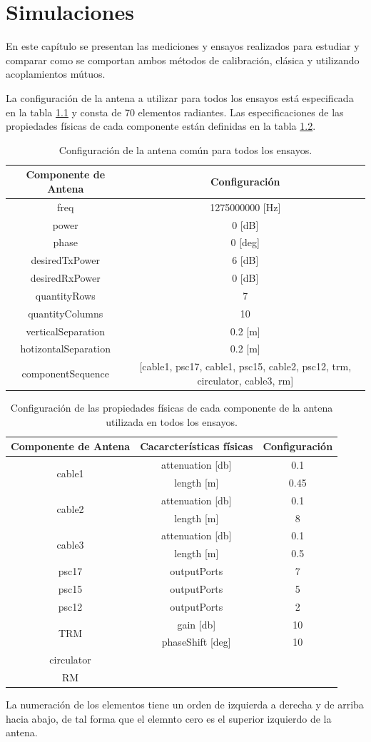 \chapter{Simulaciones}

En este capítulo se presentan las mediciones y ensayos realizados para estudiar y comparar como se comportan ambos métodos de
calibración, clásica y utilizando acoplamientos mútuos.

La configuración de la antena a utilizar para todos los ensayos está especificada en la tabla \ref{tab:configurationUsed} y 
consta de 70 elementos radiantes. Las especificaciones de las propiedades físicas de cada componente están definidas en la 
tabla \ref{tab:configurationOfComponents}.
\begin{table}[H]
  \footnotesize
  \centering
  \begin{tabular}{|c|c|}
	\hline
	\textbf{Componente de Antena} & \textbf{Configuración} \tabularnewline \hline 
	freq &  1275000000 [Hz] \tabularnewline\hline 
	power & 0 [dB] \tabularnewline \hline 
	phase & 0 [deg] \tabularnewline \hline 
	desiredTxPower & 6 [dB] \tabularnewline \hline 
	desiredRxPower & 0 [dB] \tabularnewline \hline 
	quantityRows & 7 \tabularnewline \hline 
	quantityColumns & 10 \tabularnewline \hline 
	verticalSeparation & 0.2 [m] \tabularnewline \hline 
	hotizontalSeparation & 0.2 [m] \tabularnewline \hline 
	componentSequence & [cable1, psc17, cable1, psc15, cable2, psc12, trm, circulator, cable3, rm] \tabularnewline \hline 
  \end{tabular}
  \caption{Configuración de la antena común para todos los ensayos.}
  \label{tab:configurationUsed}
\end{table}
\begin{table}[H]
  \footnotesize
  \centering
  \begin{tabular}{|c|c|c|}
	\hline
	\textbf{Componente de Antena} & \textbf{Cacarcterísticas físicas} & \textbf{Configuración} \tabularnewline \hline 
	\multirow{2}{*}{cable1} &  attenuation [db] & 0.1\tabularnewline \cline{2-3}
	 & length [m] & 0.45\tabularnewline \hline 
	\multirow{2}{*}{cable2} &  attenuation [db] & 0.1\tabularnewline \cline{2-3}
	 & length [m] & 8\tabularnewline \hline 
	\multirow{2}{*}{cable3} &  attenuation [db] & 0.1\tabularnewline \cline{2-3}
	 & length [m] & 0.5\tabularnewline \hline 
	psc17 & outputPorts & 7\tabularnewline \hline
	psc15 & outputPorts & 5\tabularnewline \hline
	psc12 & outputPorts & 2\tabularnewline \hline
	\multirow{2}{*}{TRM} & gain [db] & 10\tabularnewline \cline{2-3}
	 & phaseShift [deg] & 10\tabularnewline \hline 
	circulator & & \tabularnewline \hline 
	RM & & \tabularnewline \hline 
  \end{tabular}
  \caption{Configuración de las propiedades físicas de cada componente de la antena utilizada en todos los ensayos.}
  \label{tab:configurationOfComponents}
\end{table}
La numeración de los elementos tiene un orden de izquierda a derecha y de arriba hacia abajo, de tal forma que el elemnto cero 
es el superior izquierdo de la antena.

